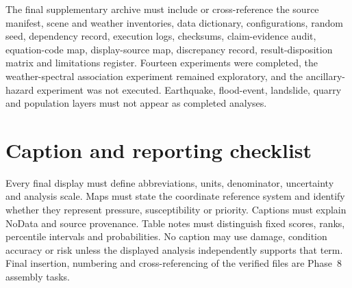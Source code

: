 The final supplementary archive must include or cross-reference the source manifest, scene and weather inventories, data dictionary, configurations, random seed, dependency record, execution logs, checksums, claim-evidence audit, equation-code map, display-source map, discrepancy record, result-disposition matrix and limitations register. Fourteen experiments were completed, the weather-spectral association experiment remained exploratory, and the ancillary-hazard experiment was not executed. Earthquake, flood-event, landslide, quarry and population layers must not appear as completed analyses.

\section{Caption and reporting checklist}

Every final display must define abbreviations, units, denominator, uncertainty and analysis scale. Maps must state the coordinate reference system and identify whether they represent pressure, susceptibility or priority. Captions must explain NoData and source provenance. Table notes must distinguish fixed scores, ranks, percentile intervals and probabilities. No caption may use damage, condition accuracy or risk unless the displayed analysis independently supports that term. Final insertion, numbering and cross-referencing of the verified files are Phase~8 assembly tasks.
